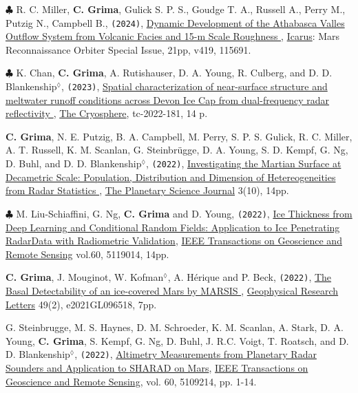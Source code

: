 \begin{etaremune}
\item
  $\clubsuit$ R. C. Miller, \textbf{C. Grima}, Gulick S. P. S., Goudge T. A., Russell A., Perry M., Putzig N., Campbell B., \texttt{(2024)}, \href{https://doi.org/10.1016/j.icarus.2023.115691}{Dynamic Development of the Athabasca Valles Outflow System from Volcanic Facies and 15-m Scale Roughness \aiOpenAccessSquare}, \ul{Icarus}: Mars Reconnaissance Orbiter Special Issue, 21pp, v419, 115691.  

\item
  $\clubsuit$ K. Chan, \textbf{C. Grima}, A. Rutishauser, D. A. Young, R. Culberg, and D. D. Blankenship$^\lozenge$, \texttt{(2023)}, \href{https://tc.copernicus.org/preprints/tc-2022-181/}{Spatial characterization of near-surface structure and meltwater runoff conditions across Devon Ice Cap from dual-frequency radar reflectivity \aiOpenAccessSquare}, \ul{The Cryosphere}, tc-2022-181, 14 p.

\item
  \textbf{C. Grima}, N. E. Putzig, B. A. Campbell, M. Perry, S. P. S. Gulick, R. C. Miller, A. T. Russell, K. M. Scanlan, G. Steinbrügge, D. A. Young, S. D. Kempf, G. Ng, D. Buhl, and D. D. Blankenship$^\lozenge$, \texttt{(2022)}, \href{https://doi.org/10.3847/PSJ/ac9277}{Investigating the Martian Surface at Decametric Scale: Population, Distribution and Dimension of Hetereogeneities from Radar Statistics \aiOpenAccessSquare}, \ul{The Planetary Science Journal} 3(10), 14pp.

\item
  $\clubsuit$ M. Liu-Schiaffini, G. Ng, \textbf{C. Grima} and D. Young, \texttt{(2022)}, \href{https://ieeexplore.ieee.org/document/9916288}{Ice Thickness from Deep Learning and Conditional Random Fields: Application to Ice Penetrating RadarData with Radiometric Validation}, \ul{IEEE Transactions on Geoscience and Remote Sensing} vol.60, 5119014, 14pp.

\item
  \textbf{C. Grima}, J. Mouginot, W. Kofman$^\lozenge$, A. Hérique and P. Beck, \texttt{(2022)}, \href{https://doi.org/10.1029/2021GL096518}{The Basal Detectability of an ice-covered Mars by MARSIS \aiOpenAccessSquare}, \ul{Geophysical Research Letters} 49(2), e2021GL096518, 7pp.
  
\item
  G. Steinbrugge, M. S. Haynes, D. M. Schroeder, K. M. Scanlan, A. Stark, D. A. Young, \textbf{C. Grima}, S. Kempf, G. Ng, D. Buhl, J. R.C. Voigt, T. Roatsch, and D. D. Blankenship$^\lozenge$, \texttt{(2022)}, \href{https://doi.org/10.1109/TGRS.2021.3134638}{Altimetry Measurements from Planetary Radar Sounders and Application to SHARAD on Mars}, \ul{IEEE Transactions on Geoscience and Remote Sensing}, vol. 60, 5109214,  pp. 1-14.
  

\end{etaremune}
